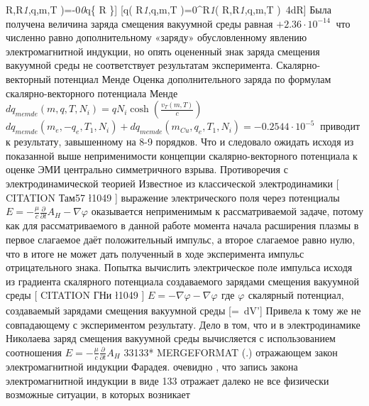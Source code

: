 \documentclass[11pt]{article}
\begin{document}
R,{{R}\emph{{1}},q,m,T
\right)=-{{\mu }}{0}}{{\varepsilon }\emph{{0}}q\left\{
R\alpha {} \right\}{]}
{[}{{q}}{}}\left( {{R}\emph{{1}},q,m,T
\right)=\int\limits}{0}^{{{R}\emph{{1}}}{{{\rho }}{}}\left(
R,{{R}\emph{{1}},q,m,T \right)}~4dR{]} Была получена
величина заряда смещения вакуумной среды равная
\(+2.36\cdot {{10}^{-14}}\ \) что численно равно дополнительному
«заряду» обусловленному явлению электромагнитной индукции, но опять
оцененный знак заряда смещения вакуумной среды не соответствует
результатам эксперимента. Скалярно-векторный потенциал Менде Оценка
дополнительного заряда по формулам скалярно-векторного потенциала Менде
\(d{{q}_{memde}}(m,q,T,{{N}_{i}})=q{{N}_{i}}\cosh \left( \frac{{{v}_{T}}\left( m,T \right)}{c} \right)\)
\(d{{q}_{memde}}({{m}_{e}},-{{q}_{e}},{{T}_{1}},{{N}_{i}})+d{{q}_{memde}}({{m}_{Cu}},{{q}_{e}},{{T}_{1}},{{N}_{i}})=-0.2544\cdot {{10}^{-5}}\ \)
приводит к результату, завышенному на 8-9 порядков. Что и следовало
ожидать исходя из показанной выше неприменимости концепции
скалярно-векторного потенциала к оценке ЭМИ центрально симметричного
взрыва. Противоречия с электродинамической теорией Известное из
классической электродинамики {[} CITATION Там57 \l 1049 {]} выражение
электрического поля через потенциалы
$E=-\frac{\mu }{c}\frac{\partial }{\partial t}{{A}_{H}}-\nabla \varphi $
оказывается неприменимым к рассматриваемой задаче, потому как для
рассматриваемого в данной работе момента начала расширения плазмы в
первое слагаемое даёт положительный импульс, а второе слагаемое равно
нулю, что в итоге не может дать полученный в ходе эксперимента импульс
отрицательного знака. Попытка вычислить электрическое поле импульса
исходя из градиента скалярного потенциала создаваемого зарядами смещения
вакуумной среды {[} CITATION ГНи \l 1049 {]}
\(E=-\nabla \varphi -\nabla {{\varphi }_{}}\) где \({{\varphi }_{}}\)
скалярный потенциал, создаваемый зарядами смещения вакуумной среды
{[}{{\varphi }}{}}=~dV'{]}
Привела к тому же не совпадающему с экспериментом результату. Дело в
том, что и в электродинамике Николаева заряд смещения вакуумной среды
вычисляется с использованием соотношения
\(E=-\frac{\mu }{c}\frac{\partial }{\partial t}{{A}_{H}}\) 33133*
MERGEFORMAT (.) отражающем закон электромагнитной индукции Фарадея.
очевидно , что запись закона электромагнитной индукции в виде 133
отражает далеко не все физически возможные ситуации, в которых возникает
\end{document}
